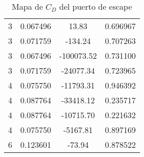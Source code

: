 \begin{table}
\begin{tabular}{cccc}
      3     & 0.067496  & 13.83         &  0.696967 \\
      3     & 0.071759  & -134.24       &  0.707263 \\
      3     & 0.067496  & -100073.52    &  0.731100 \\
      3     & 0.071759  & -24077.34     &  0.723965 \\
      4     & 0.075750  & -11793.31     &  0.946392 \\
      4     & 0.087764  & -33418.12     &  0.235717 \\
      4     & 0.087764  & -10715.70     &  0.221632 \\
      4     & 0.075750  & -5167.81      &  0.897169 \\
      6     & 0.123601  & -73.94        &  0.878522 \\ \bottomrule
    \end{tabular}
  \caption{Mapa de $C_D$ del puerto de escape} \label{tab:mapa_cd_escape}
\end{table}

